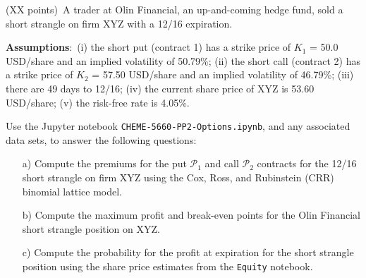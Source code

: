 \item{(XX points)~A trader at Olin Financial, an up-and-coming hedge fund, sold a short strangle on firm XYZ with a 12/16 expiration. 

\textbf{Assumptions}:~(i) the short put (contract 1) has a strike price of $K_{1}$ = 50.0 USD/share and an implied volatility of 50.79\%;
(ii) the short call (contract 2) has a strike price of $K_{2}$ = 57.50 USD/share and an implied volatility of 46.79\%;
(iii) there are 49 days to 12/16; (iv) the current share price of XYZ is 53.60 USD/share; (v) the risk-free rate is 4.05\%.

Use the Jupyter notebook \texttt{CHEME-5660-PP2-Options.ipynb}, and any associated data sets, to answer the following questions:

\begin{itemize}
    \item[a)]{Compute the premiums for the put $\mathcal{P}_{1}$ and call $\mathcal{P}_{2}$ contracts for the 12/16 short strangle on firm XYZ using
    the Cox, Ross, and Rubinstein (CRR) binomial lattice model. }
    \item[b)]{Compute the maximum profit and break-even points for the Olin Financial short strangle position on XYZ.}
    \item[c)]{Compute the probability for the profit at expiration for the short strangle position using the share price estimates from the \texttt{Equity} notebook. }
\end{itemize}
}
